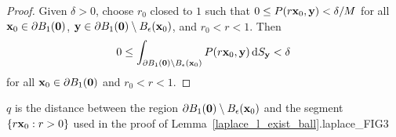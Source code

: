 \begin{proof}
Given $\delta >0$, choose $r_0$ closed to $1$ such that
$\displaystyle 0 \leq P(r\mathbf{x}_0,\mathbf{y}) < \delta/M$
for all $\displaystyle \mathbf{x}_0 \in \partial B_1(\mathbf{0})$,
$\displaystyle \mathbf{y} \in \partial B_1(\mathbf{0}) \setminus
B_\epsilon(\mathbf{x}_0)$, and $r_0 <r < 1$.  Then
\[
0 \leq \int_{\partial B_1(\mathbf{0}) \setminus B_\epsilon(\mathbf{x}_0)}
P(r\mathbf{x}_0,\mathbf{y}) \,\mathrm{d}{S}_{\mathbf{y}} < \delta
\]
for all $\mathbf{x}_0 \in \partial B_1(\mathbf{0})$ and $r_0 <r < 1$.
\end{proof}

{$q$ is the distance between the region
$\partial B_1(\mathbf{0}) \setminus B_\epsilon(\mathbf{x}_0)$ and the segment
$\{ r\mathbf{x}_0 : r >0 \}$ used in the proof of
Lemma~\ref{laplace_l_exist_ball}.}{laplace_FIG3}

